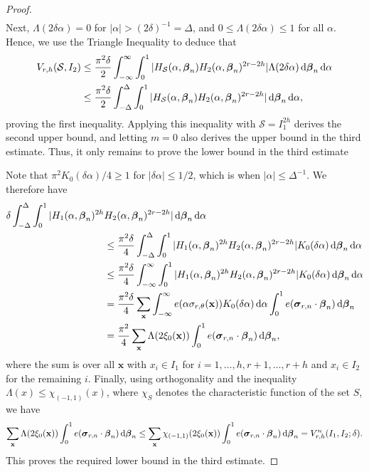 \documentclass[11pt,reqno]{amsart}
\numberwithin{equation}{section}
\renewcommand{\d}{\,{\rm d}}
\begin{document}
\begin{proof}
\begin{align*}
\end{align*}
Next, $\Lambda(2\delta\alpha) = 0$ for $|\alpha| > (2\delta)^{-1} = \Delta$, and $0 \leq \Lambda(2\delta\alpha) \leq 1$ for all $\alpha$. Hence, we use the Triangle Inequality to deduce that 
\begin{align*} V_{r,h}(\mathcal{S},I_2) & \leq \frac{\pi^2\delta}{2} \int_{-\infty}^{\infty} \int_0^1 |H_{\mathcal{S}}(\alpha,\boldsymbol{\beta}_n)H_2(\alpha,\boldsymbol{\beta}_n)^{2r-2h}| \Lambda(2\delta\alpha) \d \boldsymbol{\beta}_n \d \alpha 
\\
& \leq \frac{\pi^2\delta}{2} \int_{-\Delta}^{\Delta} \int_0^1 |H_{\mathcal{S}}(\alpha,\boldsymbol{\beta}_n)H_2(\alpha,\boldsymbol{\beta}_n)^{2r-2h}| \d \boldsymbol{\beta}_n \d \alpha, 
\end{align*}
proving the first inequality. Applying this inequality with $\mathcal{S} = I_1^{2h}$ derives the second upper bound, and letting $m=0$ also derives the upper bound in the third estimate. Thus, it only remains to prove the lower bound in the third estimate 

Note that $\pi^2K_0(\delta\alpha)/4 \geq 1$ for $|\delta\alpha| \leq 1/2$, which is when $|\alpha| \leq \Delta^{-1}$. We therefore have 
\begin{align*} 
\delta \int_{-\Delta}^{\Delta} \int_0^1 |H_1(\alpha,\boldsymbol{\beta}_n)^{2h} & H_2(\alpha,\boldsymbol{\beta}_n)^{2r-2h}| \d \boldsymbol{\beta}_n \d \alpha 
\\ & \leq \frac{\pi^2\delta}{4} \int_{-\Delta}^{\Delta} \int_0^1 |H_1(\alpha,\boldsymbol{\beta}_n)^{2h}H_2(\alpha,\boldsymbol{\beta}_n)^{2r-2h}| K_0(\delta\alpha) \d \boldsymbol{\beta}_n \d \alpha 
\\ 
& \leq \frac{\pi^2\delta}{4} \int_{-\infty}^{\infty} \int_0^1 |H_1(\alpha,\boldsymbol{\beta}_n)^{2h}H_2(\alpha,\boldsymbol{\beta}_n)^{2r-2h}| K_0(\delta\alpha) \d \boldsymbol{\beta}_n \d \alpha
\\ 
& = \frac{\pi^2\delta}{4} \sum_{\mathbf{x}} \int_{-\infty}^{\infty} e(\alpha\sigma_{r,\theta}(\mathbf{x}))K_0(\delta\alpha)\d\alpha \int_0^1 e(\boldsymbol{\sigma}_{r,n}\cdot\boldsymbol{\beta}_n)\d\boldsymbol{\beta}_n
\\ 
& = \frac{\pi^2}{4} \sum_{\mathbf{x}} \Lambda(2\xi_0(\mathbf{x})) \int_0^1 e(\boldsymbol{\sigma}_{r,n}\cdot\boldsymbol{\beta}_n)\d\boldsymbol{\beta}_n,
\end{align*}
where the sum is over all $\mathbf{x}$ with $x_i \in I_1$ for $i = 1,\ldots,h, r+1,\ldots,r+h$ and $x_i \in I_2$ for the remaining $i$. Finally, using orthogonality and the inequality $\Lambda(x) \leq \chi_{(-1,1)}(x)$, where $\chi_S$ denotes the characteristic function of the set $S$, we have 
\[ \sum_{\mathbf{x}} \Lambda(2\xi_0(\mathbf{x})) \int_0^1 e(\boldsymbol{\sigma}_{r,n}\cdot\boldsymbol{\beta}_n)\d\boldsymbol{\beta}_n \leq \sum_{\mathbf{x}} \chi_{(-1,1)}(2\xi_0(\mathbf{x})) \int_0^1 e(\boldsymbol{\sigma}_{r,n}\cdot\boldsymbol{\beta}_n)\d\boldsymbol{\beta}_n = V_{r,h}^n(I_1,I_2;\delta). \]
This proves the required lower bound in the third estimate. 
\end{proof} 
\end{document}
